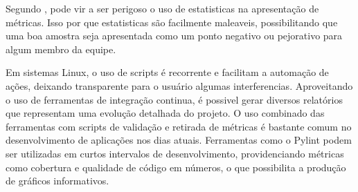 Segundo \cite{crispin2009agile}, pode vir a ser perigoso o uso de estatisticas na apresentação de métricas. Isso por que estatisticas são facilmente maleaveis, possibilitando que uma boa amostra seja apresentada como um ponto negativo ou pejorativo para algum membro da equipe.

Em sistemas Linux, o uso de scripts é recorrente e facilitam a automação de ações, deixando transparente para o usuário algumas interferencias\cite{Advpdf}. Aproveitando o uso de ferramentas de integração continua, é possivel gerar diversos relatórios que representam uma evolução detalhada do projeto. O uso combinado das ferramentas com scripts de validação e retirada de métricas é bastante comum no desenvolvimento de aplicações nos dias atuais. Ferramentas como o Pylint podem ser utilizadas em curtos intervalos de desenvolvimento, providenciando métricas como cobertura e qualidade de código em números, o que possibilita a produção de gráficos informativos.

